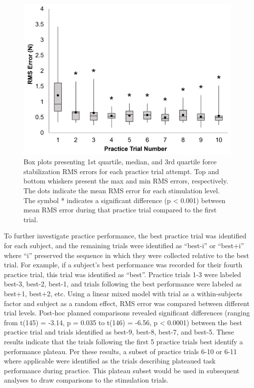 \documentclass[]{cik}%
\begin{document}
\begin{figure}

{\centering \includegraphics[width=1\textwidth,height=\textheight]{./figures/fig2.pdf}

}

\caption{\label{fig-2}Box plots presenting 1st quartile, median, and 3rd
quartile force stabilization RMS errors for each practice trial attempt.
Top and bottom whiskers present the max and min RMS errors,
respectively. The dots indicate the mean RMS error for each stimulation
level. The symbol * indicates a significant difference (p \textless{}
0.001) between mean RMS error during that practice trial compared to the
first trial.}

\end{figure}

To further investigate practice performance, the best practice trial was
identified for each subject, and the remaining trials were identified as
``best-i'' or ``best+i'' where ``i'' preserved the sequence in which
they were collected relative to the best trial. For example, if a
subject's best performance was recorded for their fourth practice trial,
this trial was identified as ``best''. Practice trials 1-3 were labeled
best-3, best-2, best-1, and trials following the best performance were
labeled as best+1, best+2, etc. Using a linear mixed model with trial as
a within-subjects factor and subject as a random effect, RMS error was
compared between different trial levels. Post-hoc planned comparisons
revealed significant differences (ranging from t(145) = -3.14, p = 0.035
to t(146) = -6.56, p \textless{} 0.0001) between the best practice trial
and trials identified as best-9, best-8, best-7, and best-5. These
results indicate that the trials following the first 5 practice trials
best identify a performance plateau. Per these results, a subset of
practice trials 6-10 or 6-11 where applicable were identified as the
trials describing plateaued task performance during practice. This
plateau subset would be used in subsequent analyses to draw comparisons
to the stimulation trials.
\end{document}
